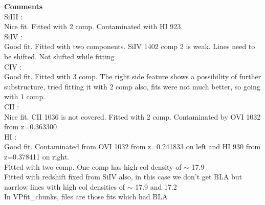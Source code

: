 \documentclass[12pt]{report}
\begin{document}
\textbf{Comments}  \\


SiIII :  \\  \hspace*{1.5cm}
        Nice fit. Fitted with 2 comp. Contaminated with HI 923. \\ 

SiIV :  \\  \hspace*{1.5cm}
        Good fit. Fitted with two components. SiIV 1402 comp 2 is weak. Lines need to be shifted. Not shifted while fitting        \\

CIV :  \\  \hspace*{1.5cm}
        Good fit. Fitted with 3 comp. The right side feature shows a possibility of further substructure, tried fitting it with 2 comp also, fits were not much better, so going with 1 comp.       \\            

CII :  \\  \hspace*{1.5cm}
        Nice fit. CII 1036 is not covered. Fitted with 2 comp. Contaminated by OVI 1032 from z=0.363300  \\

HI :  \\  \hspace*{1.5cm}
        Good fit. Contaminated from OVI 1032 from z=0.241833 on left and HI 930 from z=0.378411 on right.  \\
        Fitted with two comp. One comp has high col density of  $\sim$ 17.9  \\

        Fitted with redshift fixed from SiIV also, in this case we don't get BLA but narrlow lines with high col densities of  $\sim$  17.9 and 17.2  \\
        In VPfit\_chunks, files are those fits which had BLA  \\


\newpage
\end{document}
